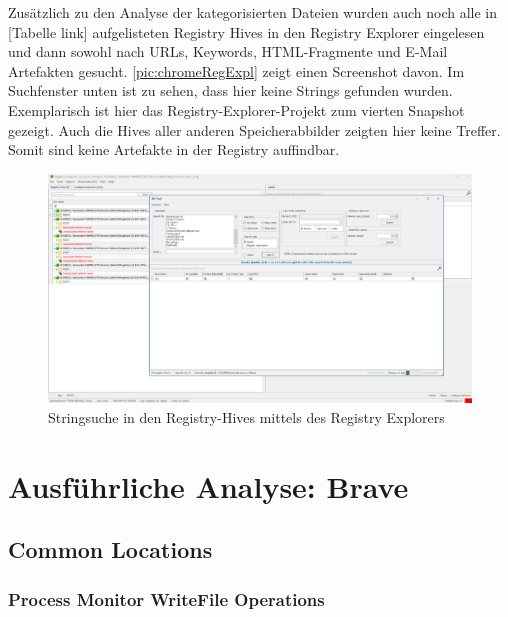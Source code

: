 \begin{appendices}
Zusätzlich zu den Analyse der kategorisierten Dateien wurden auch noch alle in [Tabelle link] aufgelisteten Registry Hives in den Registry Explorer eingelesen und dann sowohl nach URLs, Keywords, HTML-Fragmente und E-Mail Artefakten gesucht. \autoref{pic:chromeRegExpl} zeigt einen Screenshot davon. Im Suchfenster unten ist zu sehen, dass hier keine Strings gefunden wurden. Exemplarisch ist hier das Registry-Explorer-Projekt zum vierten Snapshot gezeigt. Auch die Hives aller anderen Speicherabbilder zeigten hier keine Treffer. Somit sind keine Artefakte in der Registry auffindbar.

\begin{figure}[h!]
	\centering
	\includegraphics[width=\textwidth]{bilder/RegExpl.png}
	\caption{Stringsuche in den Registry-Hives mittels des Registry Explorers}
	\label{pic:chromeRegExpl}
\end{figure}


\section{Ausführliche Analyse: Brave}
\subsection{Common Locations}
\label{subsection:appendix-brave-common-locations}
\subsubsection*{Process Monitor WriteFile Operations}
\label{subsubsection:appendix-brave-common-locations-writefile-operations}




\end{appendices}
